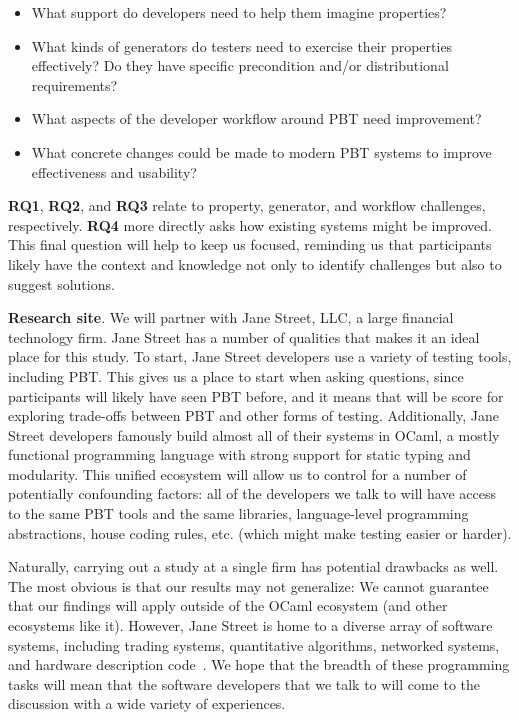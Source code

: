 \begin{itemize}[noitemsep,leftmargin=4em]
\item[\bf RQ1.] What support do developers need to help them imagine properties? 
\item[\bf RQ2.] What kinds of generators do testers need to exercise their
  properties effectively? Do they have specific precondition and/or distributional
  requirements?
\item[\bf RQ3.] What aspects of the developer workflow around PBT need improvement?
\item[\bf RQ4.] What concrete changes could be made to modern PBT systems
  to improve effectiveness and usability?
\end{itemize}

{\bf RQ1}, {\bf RQ2}, and {\bf RQ3} relate to property,
generator, and workflow challenges, respectively.
{\bf RQ4} more directly asks how existing systems might
be improved. This final question will help to keep us focused,
reminding us that participants likely have the context and knowledge not
only to identify challenges but also to suggest
solutions.

\textbf{Research site}. We will partner with Jane Street, LLC, a large
financial technology firm.
Jane Street has a number of qualities that makes it an ideal place for
this study. To start, Jane Street developers use
a variety of testing tools, including PBT. This gives us a place to start
when asking questions, since participants will likely have seen PBT before,
and it means that will be score for exploring trade-offs between PBT and
other forms of testing.
Additionally, Jane Street developers famously build almost all of their
systems in OCaml, a mostly functional programming language with strong support
for static typing and modularity. This unified ecosystem
will allow
us to control for a number of potentially confounding factors: all of the
developers we talk to will have access to the same PBT tools and the same
libraries, language-level programming abstractions, house coding rules,
etc. (which might make testing easier or harder).

Naturally, carrying out a study at a single firm has potential drawbacks as
well. The most obvious is that our results may not generalize: We
cannot guarantee that our findings will apply outside of the OCaml ecosystem (and
other ecosystems like it). However, Jane Street is home to a diverse array of
software systems, including trading systems, quantitative
algorithms, networked systems, and hardware description code~\cite{signalsandthreads}.
We hope that the breadth of these programming tasks will mean that the software
developers that we talk to will come to the discussion with a wide variety of
experiences.


